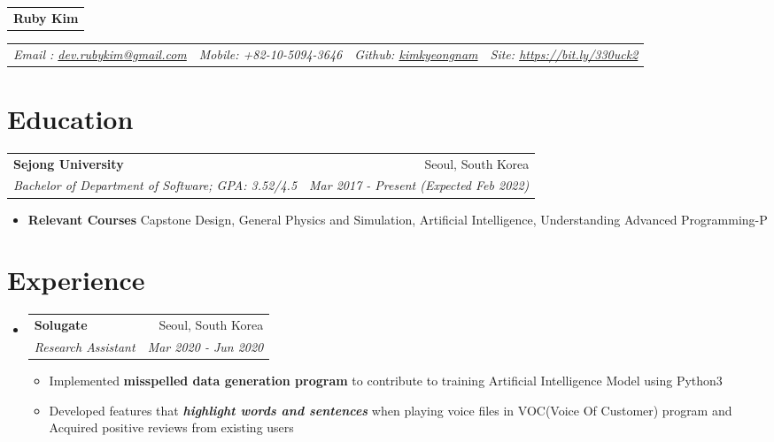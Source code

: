 \documentclass[letterpaper,11pt]{article}
\makeatletter
\newcommand{\resumeItem}[2]{
  \item\small{
    \textbf{#1}{ #2 \vspace{-2pt}}
  }
}
\newcommand{\resumeSubheading}[4]{
  \vspace{-1pt}\item
    \begin{tabular*}{0.97\textwidth}{l@{\extracolsep{\fill}}r}
      \textbf{#1} & #2 \\
      \textit{\small#3} & \textit{\small #4} \\
    \end{tabular*}\vspace{-10pt}
}
\newcommand{\resumeSubHeadingListStart}{\begin{itemize}[leftmargin=*]}
\newcommand{\resumeSubHeadingListEnd}{\end{itemize}}
\newcommand{\resumeItemListStart}{\begin{itemize}}
\newcommand{\resumeItemListEnd}{\end{itemize}\vspace{-5pt}}
\makeatother
\begin{document}

    
\begin{center}
\begin{tabular}{c}
  \textbf{\Large Ruby Kim}\\ 
\end{tabular}

 \begin{tabular}{l | c | r | a}
 \textit{ Email : \href{mailto:dev.rubykim@gmail.com}{dev.rubykim@gmail.com}} \hspace{1pt} & \hspace{1pt} \textit{Mobile: +82-10-5094-3646} \hspace{1pt}  & \hspace{1pt}  
 \textit{Github: {{\href{https://github.com/kimkyeongnam}{kimkyeongnam}}}}
 \hspace{1pt}  & \hspace{1pt}  
 \textit{Site: {{\href{https://www.notion.so/kkyy0126/Ruby-Kim-f68fd56eda8c475592e1346b4f383ae3}{https://bit.ly/330uck2}}}}\\
 
\end{tabular}
\end{center}
  


\section{Education}
  \resumeSubheading
      {Sejong University}{Seoul, South Korea}
      {Bachelor of Department of Software;  GPA: 3.52/4.5}{Mar 2017 - Present (Expected Feb 2022)}
      \resumeItemListStart
        \resumeItem{Relevant Courses}
          {Capstone Design, General Physics and Simulation, Artificial Intelligence, Understanding Advanced Programming-P}
  \resumeSubHeadingListEnd
  
\section{Experience}
  \resumeSubHeadingListStart
    \resumeSubheading
      {Solugate}{Seoul, South Korea}
      {Research Assistant}{Mar 2020 - Jun 2020}
      \resumeItemListStart
        \resumeItem {}
          {Implemented \textbf{misspelled data generation program} to contribute to training Artificial Intelligence Model using Python3}
        \resumeItem {}
          {Developed features that \textbf{\emph{highlight words and sentences}} when playing voice files in VOC(Voice Of Customer) program and Acquired positive reviews from existing users}
      \resumeItemListEnd
  \resumeSubHeadingListEnd
  
\end{document}
